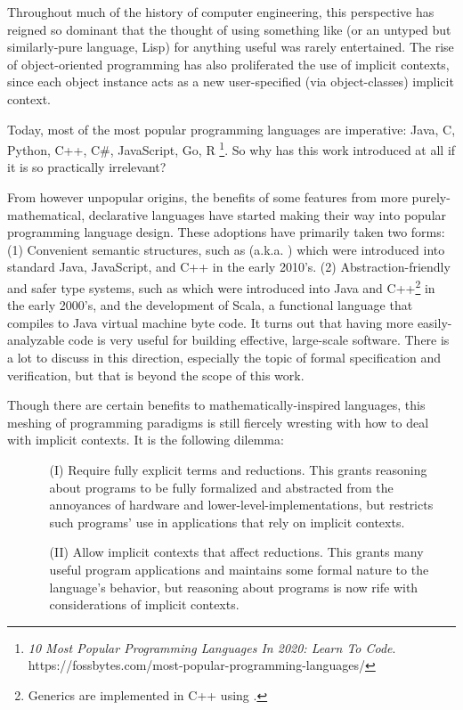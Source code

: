 Throughout much of the history of computer engineering, this perspective has reigned so dominant that the thought of using something like \LangA (or an untyped but similarly-pure language, Lisp) for anything useful was rarely entertained.
The rise of object-oriented programming has also proliferated the use of implicit contexts, since each object instance acts as a new user-specified (via object-classes) implicit context.

Today, most of the most popular programming languages are imperative:
Java, C, Python, C++, C\#, JavaScript, Go, R%
\footnote{\textit{10 Most Popular Programming Languages In 2020: Learn To Code}. https://fossbytes.com/most-popular-programming-languages/}.
So why has this work introduced \LangA at all if it is so practically irrelevant?

From however unpopular origins, the benefits of some features from more purely-mathematical, declarative languages have started making their way into popular programming language design.
These adoptions have primarily taken two forms:
(1) Convenient semantic structures, such as  (a.k.a. ) which were introduced into standard Java, JavaScript, and C++ in the early 2010's.
(2) Abstraction-friendly and safer type systems, such as  which were introduced into Java and C++\footnote{Generics are implemented in C++ using .} in the early 2000's, and the development of Scala, a functional language that compiles to Java virtual machine byte code.
It turns out that having more easily-analyzable code is very useful for building effective, large-scale software.
There is a lot to discuss in this direction, especially the topic of formal specification and verification, but that is beyond the scope of this work.

Though there are certain benefits to mathematically-inspired languages, this meshing of programming paradigms is still fiercely wresting with how to deal with implicit contexts.
It is the following dilemma:

\begin{itemize}
\item[] 
\begin{enumerate}
\item[(I)]
Require fully explicit terms and reductions.
This grants reasoning about programs to be fully formalized and abstracted from the annoyances of hardware and lower-level-implementations,
but restricts such programs' use in applications that rely on implicit contexts.
\item[(II)]
Allow implicit contexts that affect reductions.
This grants many useful program applications and maintains some formal nature to the language's behavior,
but reasoning about programs is now rife with considerations of implicit contexts.
\end{enumerate}
\end{itemize}

